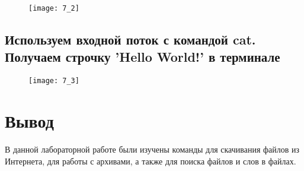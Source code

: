 \begin{figure}[H]
	\begin{center}
		\texttt{[image: 7\_2]}
		\caption{} 
		\label{pic:pic_1} %
	\end{center}
\end{figure}

\subsection{Используем входной поток с командой cat. Получаем строчку 'Hello World!' в терминале}

\begin{figure}[H]
	\begin{center}
		\texttt{[image: 7\_3]}
		\caption{} 
		\label{pic:pic_1} %
	\end{center}
\end{figure}

\section{Вывод}
В данной лабораторной работе были изучены команды для скачивания файлов из Интернета, для работы с архивами, а также для поиска файлов и слов в файлах. 

